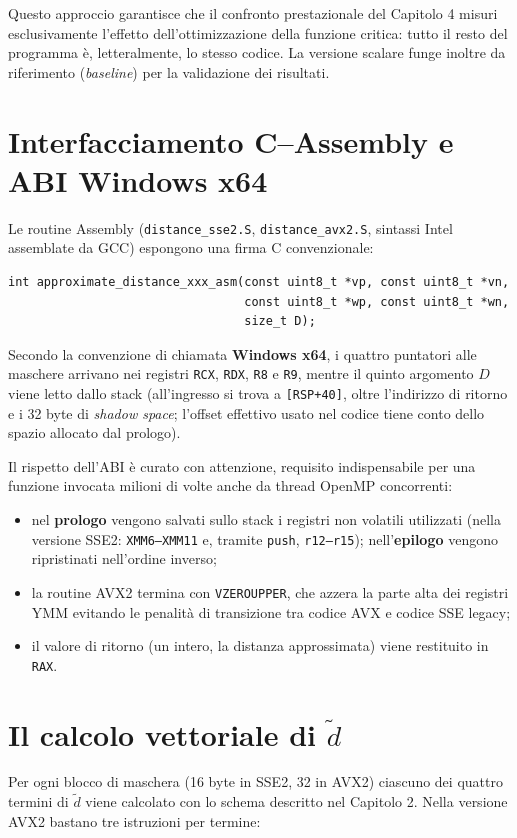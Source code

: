 Questo approccio garantisce che il confronto prestazionale del Capitolo 4 misuri esclusivamente l'effetto dell'ottimizzazione della funzione critica: tutto il resto del programma è, letteralmente, lo stesso codice. La versione scalare funge inoltre da riferimento (\emph{baseline}) per la validazione dei risultati.

\section{Interfacciamento C--Assembly e ABI Windows x64}
Le routine Assembly (\texttt{distance\_sse2.S}, \texttt{distance\_avx2.S}, sintassi Intel assemblate da GCC) espongono una firma C convenzionale:

\begin{verbatim}
int approximate_distance_xxx_asm(const uint8_t *vp, const uint8_t *vn,
                                 const uint8_t *wp, const uint8_t *wn,
                                 size_t D);
\end{verbatim}

Secondo la convenzione di chiamata \textbf{Windows x64}, i quattro puntatori alle maschere arrivano nei registri \texttt{RCX}, \texttt{RDX}, \texttt{R8} e \texttt{R9}, mentre il quinto argomento $D$ viene letto dallo stack (all'ingresso si trova a \texttt{[RSP+40]}, oltre l'indirizzo di ritorno e i 32 byte di \emph{shadow space}; l'offset effettivo usato nel codice tiene conto dello spazio allocato dal prologo).

Il rispetto dell'ABI è curato con attenzione, requisito indispensabile per una funzione invocata milioni di volte anche da thread OpenMP concorrenti:
\begin{itemize}
    \item nel \textbf{prologo} vengono salvati sullo stack i registri non volatili utilizzati (nella versione SSE2: \texttt{XMM6--XMM11} e, tramite \texttt{push}, \texttt{r12--r15}); nell'\textbf{epilogo} vengono ripristinati nell'ordine inverso;
    \item la routine AVX2 termina con \texttt{VZEROUPPER}, che azzera la parte alta dei registri YMM evitando le penalità di transizione tra codice AVX e codice SSE legacy;
    \item il valore di ritorno (un intero, la distanza approssimata) viene restituito in \texttt{RAX}.
\end{itemize}

\section{Il calcolo vettoriale di $\tilde{d}$}
Per ogni blocco di maschera (16 byte in SSE2, 32 in AVX2) ciascuno dei quattro termini di $\tilde{d}$ viene calcolato con lo schema descritto nel Capitolo 2. Nella versione AVX2 bastano tre istruzioni per termine:

